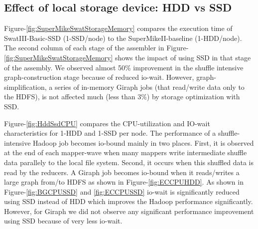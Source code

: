 \documentclass[conference]{IEEEtran}
\begin{document}
\subsection {Effect of local storage device: HDD vs SSD} \label{EffectOfSSD}
Figure-\ref{fig:SuperMikeSwatStorageMemory} compares the execution time of SwatIII-Basic-SSD (1-SSD/node) to the SuperMikeII-baseline (1-HDD/node).
The second column of each stage of the assembler in Figure-\ref{fig:SuperMikeSwatStorageMemory} shows the impact of using SSD in that stage of the assembly.
We observed almost 50\% improvement in the shuffle intensive graph-construction stage because of reduced io-wait. 
However, graph-simplification, a series of in-memory Giraph jobs (that read/write data only to the HDFS), is not affected much (less than 3\%) by storage optimization with SSD. 

Figure-\ref{fig:HddSsdCPU} compares the CPU-utilization and IO-wait characteristics for 1-HDD and 1-SSD per node.
The performance of a shuffle-intensive Hadoop job becomes io-bound mainly in two places. First, it is observed at the end of each mapper-wave when many mappers write intermediate shuffle data parallely to the local file system. Second, it occurs when this shuffled data is read by the reducers.
A Giraph job becomes io-bound when it reads/writes a large graph from/to HDFS as shown in Figure-\ref{fig:ECCPUHDD}.
As shown in Figure-\ref{fig:BGCPUSSD} and \ref{fig:ECCPUSSD} io-wait is significantly reduced using SSD instead of HDD which improves the Hadoop performance significantly. 
However, for Giraph we did not observe any significant performance improvement using SSD because of very less io-wait.
\end{document}

